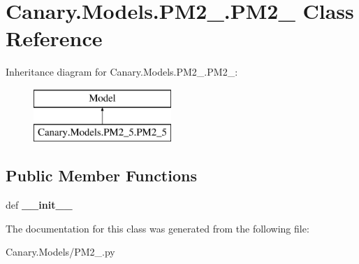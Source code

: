 \hypertarget{class_canary_8_models_1_1_p_m2__5_1_1_p_m2__5}{\section{Canary.\-Models.\-P\-M2\-\_.\-P\-M2\-\_ Class Reference}
\label{class_canary_8_models_1_1_p_m2__5_1_1_p_m2__5}
}
Inheritance diagram for Canary.\-Models.\-P\-M2\-\_.\-P\-M2\-\_\-:\begin{figure}[H]
\begin{center}
\leavevmode
\includegraphics[height=2.000000cm]{class_canary_8_models_1_1_p_m2__5_1_1_p_m2__5}
\end{center}
\end{figure}
\subsection*{Public Member Functions}
\begin{DoxyCompactItemize}
\item 
\hypertarget{class_canary_8_models_1_1_p_m2__5_1_1_p_m2__5_ae6fed0aa05910cc33fd01b21fdcc74d7}{def {\bfseries \-\_\-\-\_\-init\-\_\-\-\_\-}}\label{class_canary_8_models_1_1_p_m2__5_1_1_p_m2__5_ae6fed0aa05910cc33fd01b21fdcc74d7}

\end{DoxyCompactItemize}


The documentation for this class was generated from the following file\-:\begin{DoxyCompactItemize}
\item 
Canary.\-Models/P\-M2\-\_.\-py\end{DoxyCompactItemize}
